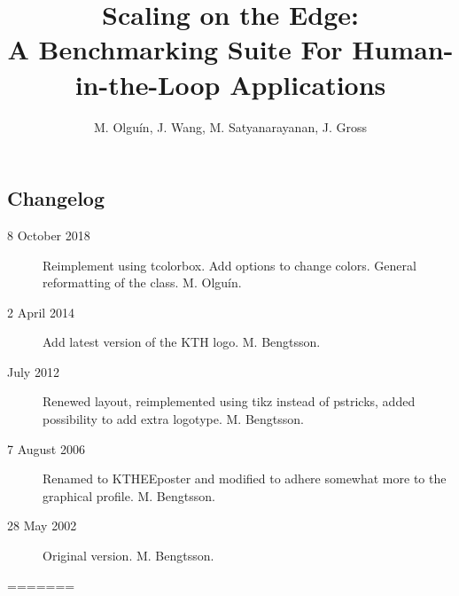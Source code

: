 \documentclass[portrait, a0]{KTHEEposter}
\begin{document}
\begin{pcolumns}[3]
\begin{pcolumn}[3]
\begin{pframe}[1.5]
                \section{Changelog}
                \begin{description}
                    \item[8 October 2018] Reimplement using tcolorbox. 
                    Add options to change colors. 
                    General reformatting of the class. M. Olguín.
                    \item[2 April 2014] Add latest version of the KTH logo. M. Bengtsson.
                    \item[July 2012] Renewed layout, reimplemented using tikz instead of pstricks, added possibility to add extra logotype. M. Bengtsson.
                    \item[7 August 2006] Renamed to KTHEEposter and modified to adhere somewhat more to the graphical profile. M. Bengtsson.
                    \item[28 May 2002] Original version. M. Bengtsson.
                \end{description}
            \end{pframe}
        \end{pcolumn}%
    \end{pcolumns}%
=======
    \title{\LARGE\bfseries Scaling on the Edge:\\A Benchmarking Suite For Human-in-the-Loop Applications}
    
    \author{\Large M. Olguín, J. Wang, M. Satyanarayanan, J. Gross}
    \maketitle
    
\end{document}
